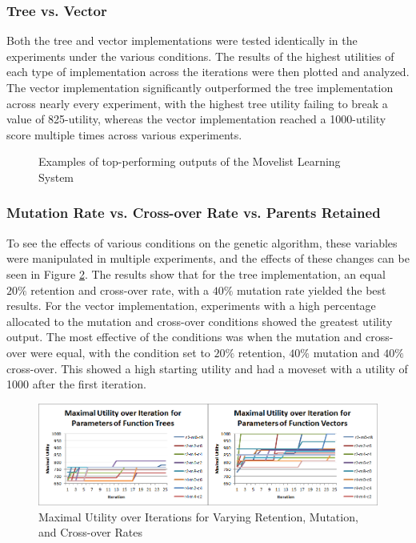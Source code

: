 \documentclass{acm_proc_article-sp}
\begin{document}
    \subsubsection{Tree vs. Vector}

Both the tree and vector implementations were tested identically in the experiments under the various conditions. The results of the highest utilities of each type of implementation across the iterations were then plotted and analyzed. The vector implementation significantly outperformed the tree implementation across nearly every experiment, with the highest tree utility failing to break a value of 825-utility, whereas the vector implementation reached a 1000-utility score multiple times across various experiments. 

\begin{figure}[h]
    \centering
    
    \caption{Examples of top-performing outputs of the Movelist Learning System}
    \label{example-results}
\end{figure}

    \subsubsection{Mutation Rate vs. Cross-over Rate vs. Parents Retained}

To see the effects of various conditions on the genetic algorithm, these variables were manipulated in multiple experiments, and the effects of these changes can be seen in Figure \ref{utility_experiments}. The results show that for the tree implementation, an equal $20\%$ retention and cross-over rate, with a $40\%$ mutation rate yielded the best results. For the vector implementation, experiments with a high percentage allocated to the mutation and cross-over conditions showed the greatest utility output. The most effective of the conditions was when the mutation and cross-over were equal, with the condition set to $20\%$ retention, $40\%$ mutation and $40\%$ cross-over. This showed a high starting utility and had a moveset with a utility of 1000 after the first iteration.


\begin{figure}[Ht]
    \centering
    \includegraphics[width=\textwidth,keepaspectratio]{./images/gen-mureco-comparison.png}
    \caption{Maximal Utility over Iterations for Varying Retention, Mutation, and Cross-over Rates}
    \label{utility_experiments}
\end{figure}
\end{document}
